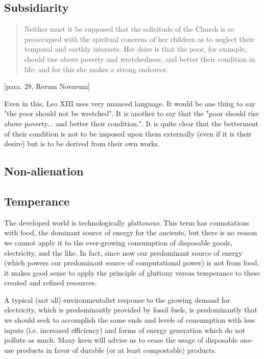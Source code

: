 \documentclass[letterpaper]{article}
\begin{document}
\subsection{Subsidiarity}

\begin{quote}
  Neither must it be supposed that the solicitude of the Church is so preoccupied with the spiritual concerns of her children as to neglect their temporal and earthly interests. Her dsire is that the poor, for example, should rise above poverty and wretchedness, and better their condition in life; and for this she makes a strong endeavor.
\end{quote} [para. 28, Rerum Novarum]

Even in this, Leo XIII uses very nuanced language. It would be one thing to say "the poor should not be wretched". It is another to say that the "poor should rise above poverty... and better their condition.".  It is quite clear that the betterment of their condition is not to be imposed upon them externally (even if it is their desire) but is to be derived from their own works.

\subsection{Non-alienation}

\subsection{Temperance}

The developed world is technologically \textit{gluttonous}. This term has connotations with food, the dominant source of energy for the ancients, but there is no reason we cannot apply it to the ever-growing consumption of disposable goods, electricity, and the like. In fact, since now our predominant source of energy (which powers our predominant source of computational power) is not from food, it makes good sense to apply the principle of gluttony versus temperance to these created and refined resources.

A typical (not all) environmentalist response to the growing demand for electricity, which is predominantly provided by fossil fuels, is predominantly that we should seek to accomplish the same ends and levels of consumption with less inputs (i.e. increased efficiency) and forms of energy generation which do not pollute as much. Many keen will advise us to cease the usage of disposable one-use products in favor of durable (or at least compostable) products.
\end{document}
